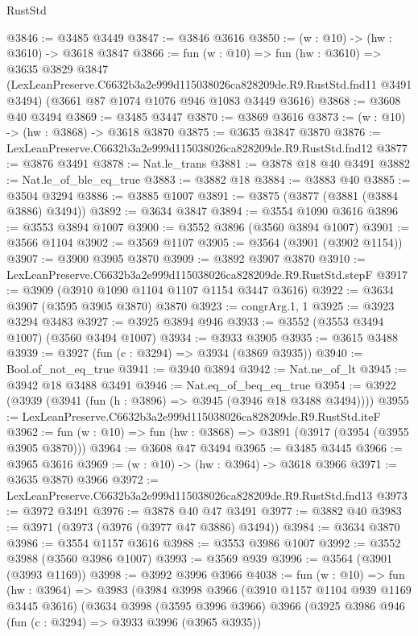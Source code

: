 \begin{lexlean}{RustStd}
\begin{coremodule}
@3846 := @3485 @3449
@3847 := @3846 @3616
@3850 := (w : @10) -> (hw : @3610) -> @3618 @3847
@3866 := fun (w : @10) =>
  fun (hw : @3610) =>
  @3635
    @3829
    @3847
    (LexLeanPreserve.C6632b3a2e999d115038026ca828209de.R9.RustStd.fnd11 @3491 @3494)
    (@3661 @87 @1074 @1076 @946 @1083 @3449 @3616)
@3868 := @3608 @40 @3494
@3869 := @3485 @3447
@3870 := @3869 @3616
@3873 := (w : @10) -> (hw : @3868) -> @3618 @3870
@3875 := @3635 @3847 @3870
@3876 := LexLeanPreserve.C6632b3a2e999d115038026ca828209de.R9.RustStd.fnd12
@3877 := @3876 @3491
@3878 := Nat.le_trans
@3881 := @3878 @18 @40 @3491
@3882 := Nat.le_of_ble_eq_true
@3883 := @3882 @18
@3884 := @3883 @40
@3885 := @3504 @3294
@3886 := @3885 @1007
@3891 := @3875 (@3877 (@3881 (@3884 @3886) @3494))
@3892 := @3634 @3847
@3894 := @3554 @1090 @3616
@3896 := @3553 @3894 @1007
@3900 := @3552 @3896 (@3560 @3894 @1007)
@3901 := @3566 @1104
@3902 := @3569 @1107
@3905 := @3564 (@3901 (@3902 @1154))
@3907 := @3900 @3905 @3870
@3909 := @3892 @3907 @3870
@3910 := LexLeanPreserve.C6632b3a2e999d115038026ca828209de.R9.RustStd.stepF
@3917 := @3909 (@3910 @1090 @1104 @1107 @1154 @3447 @3616)
@3922 := @3634 @3907 (@3595 @3905 @3870) @3870
@3923 := congrArg.{1, 1}
@3925 := @3923 @3294 @3483
@3927 := @3925 @3894 @946
@3933 := @3552 (@3553 @3494 @1007) (@3560 @3494 @1007)
@3934 := @3933 @3905
@3935 := @3615 @3488
@3939 := @3927 (fun (c : @3294) => @3934 (@3869 @3935))
@3940 := Bool.of_not_eq_true
@3941 := @3940 @3894
@3942 := Nat.ne_of_lt
@3945 := @3942 @18 @3488 @3491
@3946 := Nat.eq_of_beq_eq_true
@3954 := @3922 (@3939 (@3941 (fun (h : @3896) => @3945 (@3946 @18 @3488 @3494))))
@3955 := LexLeanPreserve.C6632b3a2e999d115038026ca828209de.R9.RustStd.iteF
@3962 := fun (w : @10) => fun (hw : @3868) => @3891 (@3917 (@3954 (@3955 @3905 @3870)))
@3964 := @3608 @47 @3494
@3965 := @3485 @3445
@3966 := @3965 @3616
@3969 := (w : @10) -> (hw : @3964) -> @3618 @3966
@3971 := @3635 @3870 @3966
@3972 := LexLeanPreserve.C6632b3a2e999d115038026ca828209de.R9.RustStd.fnd13
@3973 := @3972 @3491
@3976 := @3878 @40 @47 @3491
@3977 := @3882 @40
@3983 := @3971 (@3973 (@3976 (@3977 @47 @3886) @3494))
@3984 := @3634 @3870
@3986 := @3554 @1157 @3616
@3988 := @3553 @3986 @1007
@3992 := @3552 @3988 (@3560 @3986 @1007)
@3993 := @3569 @939
@3996 := @3564 (@3901 (@3993 @1169))
@3998 := @3992 @3996 @3966
@4038 := fun (w : @10) =>
  fun (hw : @3964) =>
  @3983
    (@3984
      @3998
      @3966
      (@3910 @1157 @1104 @939 @1169 @3445 @3616)
      (@3634
        @3998
        (@3595 @3996 @3966)
        @3966
        (@3925
          @3986
          @946
          (fun (c : @3294) => @3933 @3996 (@3965 @3935))

\end{coremodule}
\end{lexlean}
